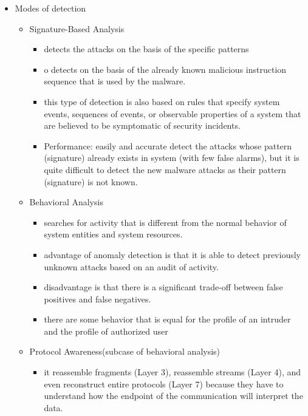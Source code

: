 \documentclass{article}
\begin{document}
\begin{itemize}
\begin{itemize}
\begin{itemize}
\begin{itemize}
            \end{itemize}
        \end{itemize}
        \item Modes of detection
        \begin{itemize}
            \item Signature-Based Analysis
            \begin{itemize}
                \item detects the attacks on the basis of the specific patterns
                \item o detects on the basis of the already known malicious instruction sequence that is used by the malware.
                \item this type of detection is also based on rules that specify system events, sequences of events, or observable properties of a system that are believed to be symptomatic of security incidents.
                \item Performance: easily and accurate detect the attacks whose pattern (signature) already exists in system (with few false alarms), but it is quite difficult to detect the new malware attacks as their pattern (signature) is not known.
            \end{itemize}
            \item Behavioral Analysis
            \begin{itemize}
                \item searches for activity that is different from the normal behavior of system entities and system resources. 
                \item advantage of anomaly detection is that it is able to detect previously unknown attacks based on an audit of activity.
                \item  disadvantage is that there is a significant trade-off between false positives and false negatives.
                \item there are some behavior that is equal for the profile of an intruder and the profile of authorized user
            \end{itemize}
            \item Protocol Awareness(subcase of behavioral analysis)
            \begin{itemize}
                \item it reassemble fragments (Layer 3), reassemble streams (Layer 4), and even reconstruct entire protocols (Layer 7) because they have to understand how the endpoint of the communication will interpret the data.

\end{itemize}
\end{itemize}
\end{itemize}
\end{itemize}
\end{document}
